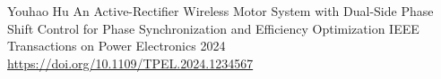 

\begin{cventries}

  \cventry
    {Youhao Hu} %
    {An Active-Rectifier Wireless Motor System with Dual-Side Phase Shift Control for
Phase Synchronization and Efficiency Optimization} %
    {IEEE Transactions on Power Electronics} %
    {2024} %
    {
      \href{https://ieeexplore.ieee.org/document/1234567}{https://doi.org/10.1109/TPEL.2024.1234567} %
    }

\end{cventries}
